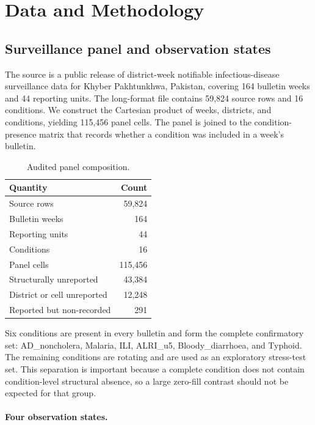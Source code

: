 \documentclass[runningheads]{llncs}
\begin{document}
\endgroup
\section{Data and Methodology}\label{sec:method}

\subsection{Surveillance panel and observation states}

The source is a public release of district-week notifiable infectious-disease surveillance data for Khyber Pakhtunkhwa, Pakistan, covering 164 bulletin weeks and 44 reporting units. The long-format file contains 59,824 source rows and 16 conditions. We construct the Cartesian product of weeks, districts, and conditions, yielding 115,456 panel cells. The panel is joined to the condition-presence matrix that records whether a condition was included in a week's bulletin.

\begin{table}
\caption{Audited panel composition.}\label{tab:data}
\centering
\begin{tabular}{lr}
\toprule
Quantity & Count \\
\midrule
Source rows & 59,824 \\
Bulletin weeks & 164 \\
Reporting units & 44 \\
Conditions & 16 \\
Panel cells & 115,456 \\
Structurally unreported & 43,384 \\
District or cell unreported & 12,248 \\
Reported but non-recorded & 291 \\
\bottomrule
\end{tabular}
\end{table}

Six conditions are present in every bulletin and form the complete confirmatory set: AD\_noncholera, Malaria, ILI, ALRI\_u5, Bloody\_diarrhoea, and Typhoid. The remaining conditions are rotating and are used as an exploratory stress-test set. This separation is important because a complete condition does not contain condition-level structural absence, so a large zero-fill contrast should not be expected for that group.

\paragraph{Four observation states.}
\end{document}
